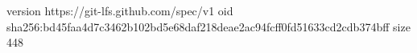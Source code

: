 version https://git-lfs.github.com/spec/v1
oid sha256:bd45faa4d7c3462b102bd5e68daf218deae2ac94fcff0fd51633cd2cdb374bff
size 448
